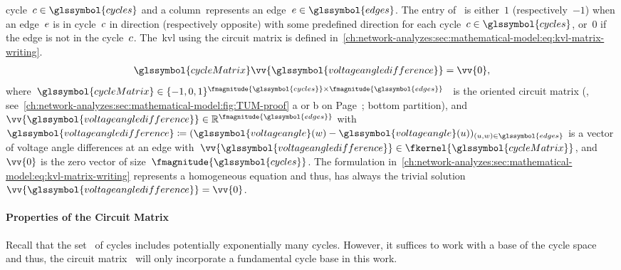 cycle~$\cycle\in\glssymbol{cycles}$ and a column~\edge represents an
edge~$\edge\in\glssymbol{edges}$. The entry of~ is
either~$1$ (respectively~$-1$) when an edge~$e$ is in cycle~$c$ in
direction (respectively opposite) with some predefined direction %
for each cycle~$\cycle\in\glssymbol{cycles}$, or~$0$ if the edge is not in the
cycle~$c$. The~\gls{kvl} using the circuit matrix is defined
in~\cref{ch:network-analyzes:sec:mathematical-model:eq:kvl-matrix-writing}.
%
\begin{align}
    \glssymbol{cycleMatrix}\vv{\glssymbol{voltageangledifference}} = \vv{0}, 
    \label{ch:network-analyzes:sec:mathematical-model:eq:kvl-matrix-writing}
\end{align}
%
where~$\glssymbol{cycleMatrix}\in\{-1,0,1\}^{\fmagnitude{\glssymbol{cycles}}\times\fmagnitude{\glssymbol{edges}}}$~\parencite[p.91]{Ses61}
is the oriented circuit matrix (\eg,
see~\cref{ch:network-analyzes:sec:mathematical-model:fig:TUM-proof} a or b on
Page~\pageref{ch:network-analyzes:sec:mathematical-model:fig:TUM-proof}; bottom
partition), and~$\vv{
\glssymbol{voltageangledifference}}\in\reals^{\fmagnitude{
\glssymbol{edges}}}$
with~$\glssymbol{voltageangledifference}\coloneqq
(\glssymbol{voltageangle}(\vertexc) -
\glssymbol{voltageangle}(\vertexa))_{(\vertexa,\vertexc)\in\glssymbol{edges}}$
is a vector of voltage angle differences at an edge
with~$\vv{\glssymbol{voltageangledifference}}\in\fkernel{\glssymbol{cycleMatrix}}$,
and~$\vv{0}$ is the zero vector of size~$\fmagnitude{\glssymbol{cycles}}$. The
formulation
in~\cref{ch:network-analyzes:sec:mathematical-model:eq:kvl-matrix-writing}
represents a homogeneous equation and thus, has always the trivial
solution~$\vv{\glssymbol{voltageangledifference}} = \vv{0}$. 
% 
\paragraph{Properties of the Circuit Matrix}
\label{ch:network-analyzes:sec:mathematical-model:paragraph:circuit-matrix-properties}
% 
Recall that the set~ of cycles includes potentially
exponentially many cycles. However, it suffices to work with a base of the cycle
space~\parencite[pp.498ff.]{Kir47} and thus, the circuit
matrix~ will only incorporate a fundamental cycle base in
this work. 


